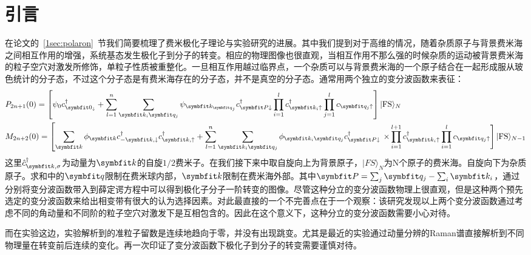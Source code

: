 \section{引言}\label{3sec:intro}
在论文的~\ref{1sec:polaron}~节我们简要梳理了费米极化子理论与实验研究的进展。其中我们提到对于高维的情况，随着杂质原子与背景费米海之间相互作用的增强，系统基态发生极化子到分子的转变。相应的物理图像也很直观，当相互作用不那么强的时候杂质的运动被背景费米海的粒子空穴对激发所修饰，单粒子性质被重整化。一旦相互作用越过临界点，一个杂质可以与背景费米海的一个原子结合在一起形成服从玻色统计的分子态，不过这个分子态是有费米海存在的分子态，并不是真空的分子态。通常用两个独立的变分波函数来表征：
\begin{equation}
\begin{aligned}
&P_{2 n+1}(0) =\left[\psi_{0} c_{\Vector{0}_{\downarrow}}^{\dagger}+\sum_{l=1}^{n} \sum_{\Vector{k}_{i} \Vector{q}_{j}} \psi_{\Vector{k}_{\Vector{q}_{j}}} c_{\Vector{P} \downarrow}^{\dagger} \prod_{i=1}^{l} c_{\Vector{k}_{i} \uparrow}^{\dagger} \prod_{j=1}^{l} c_{\Vector{q}_{j} \uparrow}\right]|\mathrm{FS}\rangle_{N}\\
&M_{2 n+2}(0)= {\left[\sum_{\Vector{k}} \phi_{\Vector{k}} c_{-\Vector{k}, \downarrow}^{\dagger} c_{\Vector{k}, \uparrow}^{\dagger}+\sum_{l=1}^{n} \sum_{\Vector{k}_{i} \Vector{q}_{j}} \phi_{\Vector{k}_{i} \Vector{q}_{j}} c_{\Vector{P} \downarrow}^{\dagger}\right.} \left.\times \prod_{i=1}^{l+1} c_{\Vector{k}_{i} \uparrow}^{\dagger} \prod_{i=1}^{l} c_{\Vector{q}_{j} \uparrow}\right]|\mathrm{FS}\rangle_{N-1}
\end{aligned}
\end{equation}
这里$\hat{c}^\dagger_{\Vector{k},\sigma}$为动量为$\Vector{k}$的自旋$1/2$费米子。在我们接下来中取自旋向上为背景原子，$|FS\rangle_N$为N个原子的费米海。自旋向下为杂质原子。求和中的$\Vector{q}$限制在费米球内部，$\Vector{k}$限制在费米海外部。其中$\Vector{P}=\sum_{j} \Vector{q}_{j}-\sum_{i} \Vector{k}_{i}$，通过分别将变分波函数带入到薛定谔方程中可以得到极化子分子一阶转变的图像。尽管这种分立的变分波函数物理上很直观，但是这种两个预先选定的变分波函数来给出相变带有很大的认为选择因素。对此最直接的一个不完善点在于一个观察\cite{edwards2013smooth}：该研究发现以上两个变分波函数通过考虑不同的角动量和不同阶的粒子空穴对激发下是互相包含的。因此在这个意义下，这种分立的变分波函数需要小心对待。

而在实验这边，实验解析到的准粒子留数是连续地趋向于零，并没有出现跳变。尤其是最近的实验通过动量分辨的Raman谱直接解析到不同物理量在转变前后连续的变化\cite{Sagi2020}。再一次印证了变分波函数下极化子到分子的转变需要谨慎对待。

